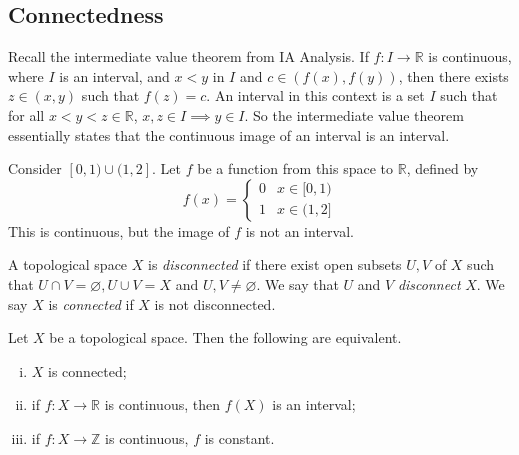 \subsection{Connectedness}
Recall the intermediate value theorem from IA Analysis.
If \( f \colon I \to \mathbb R \) is continuous, where \( I \) is an interval, and \( x < y \) in \( I \) and \( c \in (f(x), f(y)) \), then there exists \( z \in (x,y) \) such that \( f(z) = c \).
An interval in this context is a set \( I \) such that for all \( x<y<z \in \mathbb R \), \( x,z \in I \implies y \in I \).
So the intermediate value theorem essentially states that the continuous image of an interval is an interval.
\begin{example}
	Consider \( [0,1) \cup (1,2] \).
	Let \( f \) be a function from this space to \( \mathbb R \), defined by
	\[
		f(x) = \begin{cases}
			0 & x \in [0,1) \\
			1 & x \in (1,2]
		\end{cases}
	\]
	This is continuous, but the image of \( f \) is not an interval.
\end{example}
\begin{definition}
	A topological space \( X \) is \textit{disconnected} if there exist open subsets \( U, V \) of \( X \) such that \( U \cap V = \varnothing, U \cup V = X \) and \( U, V \neq \varnothing \).
	We say that \( U \) and \( V \) \textit{disconnect} \( X \).
	We say \( X \) is \textit{connected} if \( X \) is not disconnected.
\end{definition}
\begin{theorem}
	Let \( X \) be a topological space.
	Then the following are equivalent.
	\begin{enumerate}[(i)]
		\item \( X \) is connected;
		\item if \( f \colon X \to \mathbb R \) is continuous, then \( f(X) \) is an interval;
		\item if \( f \colon X \to \mathbb Z \) is continuous, \( f \) is constant.
	\end{enumerate}
\end{theorem}
